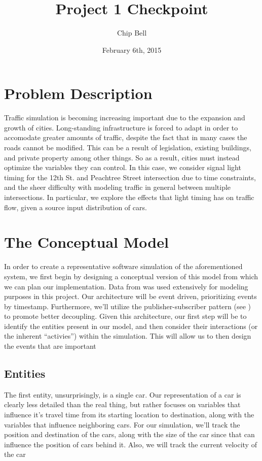 \documentclass[a4paper,12pt]{article}
\begin{document}
\title{Project 1 Checkpoint}
\author{Chip Bell}
\date{February 6th, 2015}
\maketitle

\section{Problem Description}
Traffic simulation is becoming increasing important due to the expansion and growth of cities. Long-standing
infrastructure is forced to adapt in order to accomodate greater amounts of traffic, despite the fact that in many
cases the roads cannot be modified. This can be a result of legislation, existing buildings, and private property among
other things. So as a result, cities must instead optimize the variables they can control. In this case, we consider
signal light timing for the 12th St. and Peachtree Street intersection due to
time constraints, and the sheer difficulty with modeling traffic in general between multiple intersections. In particular,
we explore the effects that light timing has on traffic flow, given a source input distribution of cars.

\section{The Conceptual Model}
In order to create a representative software simulation of the aforementioned system, we first begin by designing a
conceptual version of this model from which we can plan our implementation. Data from \cite{cts12} was used extensively %
for modeling purposes in this project. Our architecture will be event driven, prioritizing events by timestamp. Furthermore,
we'll utilize the publisher-subscriber pattern (see \cite{pubsub}) to promote better decoupling.
Given this architecture, our first step will be to identify the entities present in our model, and then consider their
interactions (or the inherent ``activies'') within the simulation. This will allow us to then design the events that
are important

\subsection{Entities}
The first entity, unsurprisingly, is a single car. Our representation of a car is clearly less detailed than the real
thing, but rather focuses on variables that influence it's travel time from its starting location to destination, along
with the variables that influence neighboring cars. For our simulation, we'll track the position and destination of the
cars, along with the size of the car since that can influence the position of cars behind it. Also, we will track the
current velocity of the car 
\end{document}
